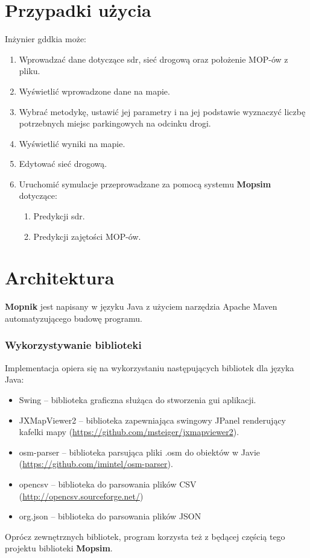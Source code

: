 \section{Przypadki użycia}
Inżynier \acrshort{gddkia} może:
\begin{enumerate}
  \item Wprowadzać dane dotyczące \acrshort{sdr}, sieć drogową oraz położenie MOP-ów z pliku.
  \item Wyświetlić wprowadzone dane na mapie.
  \item Wybrać metodykę, ustawić jej parametry i na jej podstawie wyznaczyć
    liczbę potrzebnych miejsc parkingowych na odcinku drogi.
  \item Wyświetlić wyniki na mapie.
  \item Edytować sieć drogową. 
  \item Uruchomić symulacje przeprowadzane za pomocą systemu
    \textbf{Mopsim} dotyczące:
    \begin{enumerate}
      \item Predykcji \acrshort{sdr}.
      \item Predykcji zajętości MOP-ów.
    \end{enumerate}
\end{enumerate}

\section{Architektura}
\textbf{Mopnik} jest napisany w języku Java z użyciem narzędzia Apache
Maven automatyzującego budowę programu.
\subsubsection{Wykorzystywanie biblioteki}
Implementacja opiera się na wykorzystaniu następujących bibliotek dla języka
Java:
\begin{itemize}
\item Swing -- biblioteka graficzna służąca do stworzenia \acrshort{gui} aplikacji.
\item JXMapViewer2 -- biblioteka zapewniająca swingowy JPanel renderujący
  kafelki mapy (\url{https://github.com/msteiger/jxmapviewer2}).
\item osm-parser -- biblioteka parsująca pliki .osm do obiektów w Javie
  (\url{https://github.com/imintel/osm-parser}).
\item opencsv -- biblioteka do parsowania plików CSV
  (\url{http://opencsv.sourceforge.net/})
\item org.json -- biblioteka do parsowania plików JSON 
\end{itemize}
Oprócz zewnętrznych bibliotek, program korzysta też z będącej częścią tego
projektu biblioteki \textbf{Mopsim}. 
